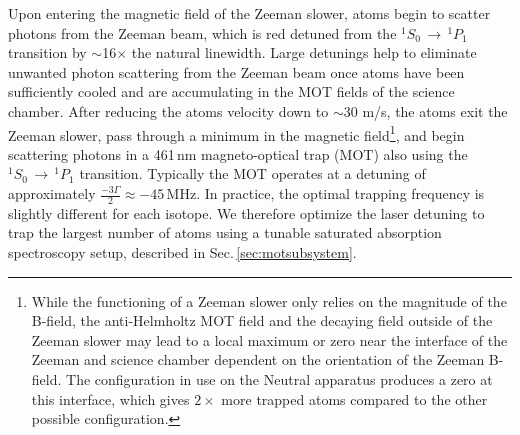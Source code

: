 Upon entering the magnetic field of the Zeeman slower, atoms begin to scatter photons from the Zeeman beam, which is red detuned from the $^1S_0\,\rightarrow\,^1P_1$ transition by $\sim$16$\times$ the natural linewidth.
Large detunings help to eliminate unwanted photon scattering from the Zeeman beam once atoms have been sufficiently cooled and are accumulating in the MOT fields of the science chamber. 
After reducing the atoms velocity down to $\sim$30 m/s, the atoms exit the Zeeman slower, pass through a minimum in the magnetic field\footnote{
While the functioning of a Zeeman slower only relies on the magnitude of the B-field, the anti-Helmholtz MOT field and the decaying field outside of the Zeeman slower may lead to a local maximum or zero near the interface of the Zeeman and science chamber dependent on the orientation of the Zeeman B-field.
The configuration in use on the Neutral apparatus produces a zero at this interface, which gives $2\times$ more trapped atoms compared to the other possible configuration.}, and begin scattering photons in a 461\,nm magneto-optical trap (MOT) also using the $^1S_0\,\rightarrow\,^1P_1$ transition. 
Typically the MOT operates at a detuning of approximately $\frac{-3\Gamma}{2} \approx -45\,$MHz. 
In practice, the optimal trapping frequency is slightly different for each isotope.
We therefore optimize the laser detuning to trap the largest number of atoms using a tunable saturated absorption spectroscopy setup, described in Sec.\,\ref{sec:motsubsystem}. 



